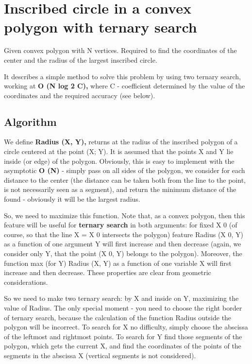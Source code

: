 \section{ Inscribed circle in a convex polygon with ternary search }
Given convex polygon with N vertices. Required to find the coordinates of the center and the radius of the largest inscribed circle.

It describes a simple method to solve this problem by using two ternary search, working at \textbf{O (N log 2 C),} where C - coefficient determined by the value of the coordinates and the required accuracy (see below).

\subsection{ Algorithm }
We define \textbf{Radius (X, Y),} returns at the radius of the inscribed polygon of a circle centered at the point (X; Y). It is assumed that the points X and Y lie inside (or edge) of the polygon. Obviously, this is easy to implement with the asymptotic \textbf{O (N)} - simply pass on all sides of the polygon, we consider for each distance to the center (the distance can be taken both from the line to the point, is not necessarily seen as a segment), and return the minimum distance of the found - obviously it will be the largest radius.

So, we need to maximize this function. Note that, as a convex polygon, then this feature will be useful for \textbf{ternary search} in both arguments: for fixed X 0 (of course, so that the line X = X 0 intersects the polygon) feature Radius (X 0, Y) as a function of one argument Y will first increase and then decrease (again, we consider only Y, that the point (X 0, Y) belongs to the polygon). Moreover, the function max (for Y) {Radius (X, Y)} as a function of one variable X will first increase and then decrease. These properties are clear from geometric considerations.

So we need to make two ternary search: by X and inside on Y, maximizing the value of Radius. The only special moment - you need to choose the right border of ternary search, because the calculation of the function Radius outside the polygon will be incorrect. To search for X no difficulty, simply choose the abscissa of the leftmost and rightmost points. To search for Y find those segments of the polygon, which gets the current X, and find the coordinates of the points of the segments in the abscissa X (vertical segments is not considered).

